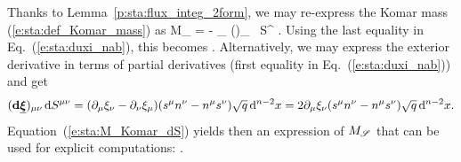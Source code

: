 Thanks to Lemma~\ref{p:sta:flux_integ_2form}, we may re-express the Komar mass
(\ref{e:sta:def_Komar_mass}) as
\be \label{e:sta:M_Komar_dS}
   M_{\Sp} = -   \int_{\Sp} (\dd \uu{\xi})_{\mu\nu} \,  \D S^{\mu\nu} .
\ee
Using the last equality in Eq.~(\ref{e:sta:duxi_nab}), this becomes
\be \label{e:sta:Komar_mass_flux_nabla_xi}
     .
\ee
Alternatively, we may express the exterior derivative in terms of
partial derivatives (first equality in Eq.~(\ref{e:sta:duxi_nab})) and get
\[
    (\mathbf{d} \underline{\bm{\xi}})_{\mu\nu} \,  \mathrm{d} S^{\mu\nu} =
    (\partial_\mu \xi_\nu - \partial_\nu \xi_\mu)
    (s^\mu n^\nu - n^\mu s^\nu) \sqrt{q}\, \mathrm{d}^{n-2} x
    = 2 \partial_\mu \xi_\nu  (s^\mu  n^\nu - n^\mu  s^\nu)
    \sqrt{q}\, \mathrm{d}^{n-2} x  .
\]
Equation~(\ref{e:sta:M_Komar_dS}) yields then an expression of $M_{\mathscr{S}}$ that
can be used for explicit computations:
\be \label{e:sta:M_Komar_partial_der}
     .
\ee

